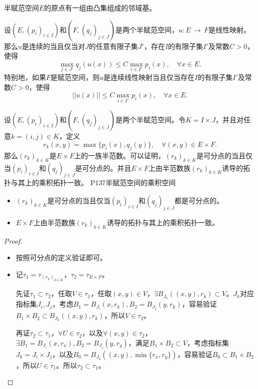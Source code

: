 \begin{theorem}\label{XQHthe070202}
	半赋范空间$E$的原点有一组由凸集组成的邻域基。
\end{theorem}

\begin{theorem}
	设$(E,(p_{i})_{i\in I}) $和$(F,(q_{j})_{j\in J}) $是两个半赋范空间，$ u: E\, \rightarrow \, F$是线性映射。那么$u$是连续的当且仅当对$J$的任意有限子集$J' $，存在$I$的有限子集$I'$及常数$C>0$，使得
	\begin{equation*}
		\max_{j\in J'} q_{j}(u(x))\leq C\max_{i\in I'} p_{i}(x),\quad \forall x\in E.
	\end{equation*}
	特别地，如果$F$是赋范空间，则$u$是连续线性映射当且仅当存在$I$的有限子集$I' $及常数$C>0 $，使得
	\begin{equation*}
		||u(x)||\leq C\max_{i\in I'}p_{i}(x),\quad \forall x\in E.
	\end{equation*}
\end{theorem}

\original
{
	设$(E,(p_{i})_{i\in I}) $和$(F,(q_{j})_{j\in J}) $是两个半赋范空间。令$K=I\times J $，并且对任意$k=(i,j) \in K $，定义
	\begin{equation*}
		r_{k}(x,y)=\max\{p_{i}(x),q_{j}(y)\},\quad \forall (x,y)\in E\times F.
	\end{equation*}
	那么$(r_{k})_{k\in K}$是$E\times F $上的一族半范数。可以证明，$(r_{k})_{k\in K} $是可分点的当且仅当$(p_{i})_{i\in I} $和$(q_{j})_{j\in J} $是可分点的。并且$E\times F$上由半范数族$(r_{k})_{k\in K} $诱导的拓扑与其上的乘积拓扑一致。
}
{P137半赋范空间的乘积空间}
\begin{proposition}
	\begin{itemize}
		\item $(r_{k})_{k\in K} $是可分点的当且仅当$(p_{i})_{i\in I} $和$(q_{j})_{j\in J} $都是可分点的。
		\item $E\times F$上由半范数族$(r_{k})_{k\in K} $诱导的拓扑与其上的乘积拓扑一致。
	\end{itemize}
\end{proposition}

\begin{proof}
	\begin{itemize}
		\item 按照可分点的定义验证即可。
		\item 记$\tau_{1}=\tau_{(r_{k})_{k\in K}} $，$\tau_{2}=\tau_{E\times F} $。\par
		先证$\tau_{1}\subset \tau_{2} $，任取$V\in \tau_{1} $，任取$(x,y)\in V $，$\exists B_{J_{k}}((x,y),r_{k})\subset V $。$J_{k} $对应指标集$J_{i},J_{j} $，考虑$B_{1}=B_{J_{i}}(x,r_{k}),B_{2}=B_{J_{j}}(y,r_{k})$，容易验证$B_{1}\times B_{2}\subset B_{J_{k}}((x,y),r_{k}) $，所以$V\in \tau_{2}$。\par
		再证$\tau_{2}\subset \tau_{1} $，$\forall U\in \tau_{2} $，以及$\forall (x,y)\in \tau_{2}$，$\exists B_{1}=B_{J_{i}}(x,r_{x}),B_{2}=B_{J_{j}}(y,r_{y}) $，满足$B_{1}\times B_{2}\subset V $，考虑指标集$J_{k}=J_{i}\times J_{j} $，以及$B_{0}=B_{J_{k}}((x,y),\min\{r_{x},r_{y}\}) $，容易验证$B_{0}\subset B_{1}\times B_{2} $，所以$U\in \tau_{1} $。所以$\tau_{2}\subset \tau_{1} $。
	\end{itemize}
\end{proof}	

